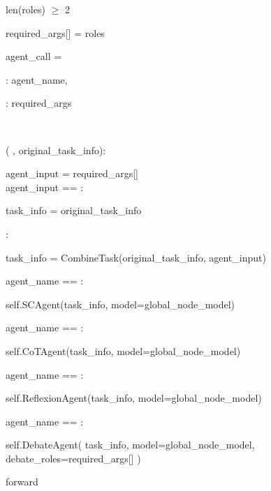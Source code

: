 \begin{subagent}[title=低 \masness 解析器]
\quad\quad {} len(roles) $\geq$ 2

\quad\quad required\_args[] = roles \\


\quad {}

\quad agent\_call = \code{\{}

\quad\quad {}: agent\_name,

\quad\quad {}: required\_args

\quad \code{\}} \\


\quad {}

\quad {}  (
, original\_task\_info):

\quad\quad agent\_input = required\_args[] \\

\quad\quad {} agent\_input == :

\quad\quad\quad task\_info = original\_task\_info

\quad\quad {}:

\quad\quad\quad task\_info = CombineTask(original\_task\_info,
agent\_input) \\

\quad\quad {}

\quad\quad {} agent\_name == :

\quad\quad\quad {}  self.SCAgent(task\_info, model=global\_node\_model)

\quad\quad {} agent\_name == :

\quad\quad\quad {}  self.CoTAgent(task\_info, model=global\_node\_model)

\quad\quad {} agent\_name == :

\quad\quad\quad {}  self.ReflexionAgent(task\_info, model=global\_node\_model)

\quad\quad {} agent\_name == :

\quad\quad\quad {}  self.DebateAgent(
task\_info,
model=global\_node\_model,
debate\_roles=required\_args[]
)

\quad {} forward 
\end{subagent}

